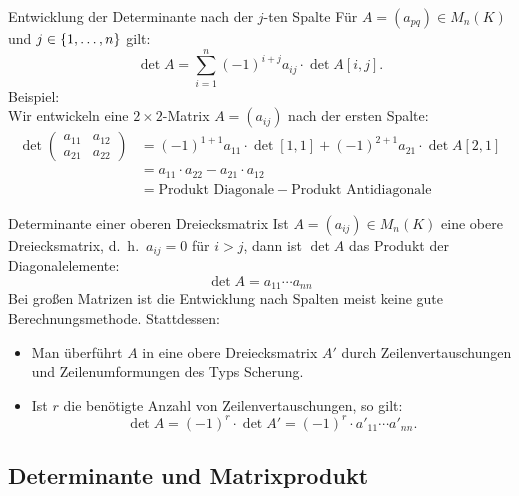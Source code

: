 \documentclass[main.tex]{subfiles}
\begin{document}
\begin{karte}{Entwicklung der Determinante nach der \(j\)-ten Spalte}
    Für \(A = (a_{pq}) \in M_n(K)\) und \(j \in \{1, \ldots ,n\}\) gilt:
    \[\det A = \sum_{i=1}^n {(-1)}^{i+j}a_{ij} \cdot \det A[i,j].\]
    Beispiel: \\
    Wir entwickeln eine \(2 \times 2\)-Matrix \(A = (a_{ij})\) nach der
    ersten Spalte: 
    \[ \begin{split}
        \det 
        \begin{pmatrix}
        a_{11} & a_{12} \\
        a_{21} & a_{22}    
         \end{pmatrix} 
    & = {(-1)}^{1+1}a_{11} \cdot \det [1,1] + {(-1)}^{2+1}a_{21} \cdot \det A[2,1] \\
    & = a_{11} \cdot a_{22} - a_{21} \cdot a_{12}\\
    & = \text{Produkt Diagonale} - \text{Produkt Antidiagonale}
    \end{split} 
    \]
\end{karte}
\begin{karte}{Determinante einer oberen Dreiecksmatrix} 
    Ist \(A = (a_{ij}) \in M_n(K)\) eine obere Dreiecksmatrix, d.\ h.\ 
    \(a_{ij} = 0\) für \(i > j\), dann ist \(\det A\) das Produkt der 
    Diagonalelemente: 
    \[\det A = a_{11} \cdots a_{nn}\]
    Bei großen Matrizen ist die Entwicklung nach Spalten meist keine 
    gute Berechnungsmethode. Stattdessen: 
    \begin{itemize}
       \item Man überführt \(A\) in  eine obere Dreiecksmatrix 
       \(A'\) durch Zeilenvertauschungen und Zeilenumformungen des 
       Typs Scherung.
       \item Ist \(r\) die benötigte Anzahl von Zeilenvertauschungen, so gilt:
       \[\det A = {(-1)}^r \cdot \det A' = {(-1)}^r \cdot a'_{11} \cdots a'_{nn} .\]
    \end{itemize}
\end{karte}

\subsection*{Determinante und Matrixprodukt}
\end{document}
